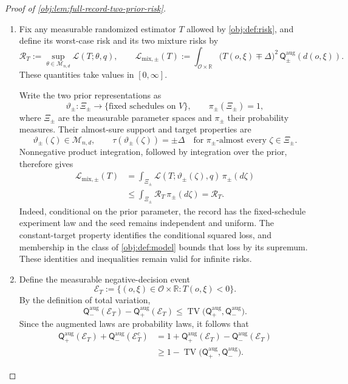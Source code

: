 \begin{proof}[Proof of \cref{obj:lem:full-record-two-prior-risk}]
\begin{enumerate}
\item Fix any measurable randomized estimator \(T\) allowed by
\cref{obj:def:risk}, and define its worst-case risk and its two mixture risks by
\[
\mathcal R_T
:=
\sup_{\theta\in\mathcal M_{n,d}}\mathcal L(T;\theta,q),
\qquad
\mathcal L_{\mathrm{mix},\pm}(T)
:=
\int_{\mathcal O\times\mathbb R}
\bigl(T(o,\xi)\mp\Delta\bigr)^2\,
\mathsf Q_\pm^{\mathrm{aug}}(d(o,\xi)).
\]
These quantities take values in \([0,\infty]\).

Write the two prior representations as
\[
\vartheta_\pm:\Xi_\pm\longrightarrow
\{\text{fixed schedules on }V\},
\qquad
\pi_\pm(\Xi_\pm)=1,
\]
where \(\Xi_\pm\) are the measurable parameter spaces and \(\pi_\pm\) their probability measures. Their almost-sure support and target properties are
\[
\vartheta_\pm(\zeta)\in\mathcal M_{n,d},
\qquad
\tau(\vartheta_\pm(\zeta))=\pm\Delta
\quad\text{for }\pi_\pm\text{-almost every }\zeta\in\Xi_\pm.
\]
Nonnegative product integration, followed by integration over the prior, therefore gives
\[
\begin{aligned}
\mathcal L_{\mathrm{mix},\pm}(T)
&=
\int_{\Xi_\pm}
\mathcal L(T;\vartheta_\pm(\zeta),q)\,\pi_\pm(d\zeta)\\
&\le
\int_{\Xi_\pm}\mathcal R_T\,\pi_\pm(d\zeta)
=
\mathcal R_T.
\end{aligned}
\]
Indeed, conditional on the prior parameter, the record has the fixed-schedule experiment law and the seed remains independent and uniform. The constant-target property identifies the conditional squared loss, and membership in the class of \cref{obj:def:model} bounds that loss by its supremum. These identities and inequalities remain valid for infinite risks.

\item Define the measurable negative-decision event
\[
\mathcal E_T
:=
\{(o,\xi)\in\mathcal O\times\mathbb R:T(o,\xi)<0\}.
\]
By the definition of total variation,
\[
\mathsf Q_-^{\mathrm{aug}}(\mathcal E_T)
-\mathsf Q_+^{\mathrm{aug}}(\mathcal E_T)
\le
\operatorname{TV}
\bigl(\mathsf Q_+^{\mathrm{aug}},\mathsf Q_-^{\mathrm{aug}}\bigr).
\]
Since the augmented laws are probability laws, it follows that
\[
\begin{aligned}
\mathsf Q_+^{\mathrm{aug}}(\mathcal E_T)
+\mathsf Q_-^{\mathrm{aug}}(\mathcal E_T^c)
&=
1+\mathsf Q_+^{\mathrm{aug}}(\mathcal E_T)
-\mathsf Q_-^{\mathrm{aug}}(\mathcal E_T)\\
&\ge
1-\operatorname{TV}
\bigl(\mathsf Q_+^{\mathrm{aug}},\mathsf Q_-^{\mathrm{aug}}\bigr).
\end{aligned}
\]


\end{enumerate}
\end{proof}
